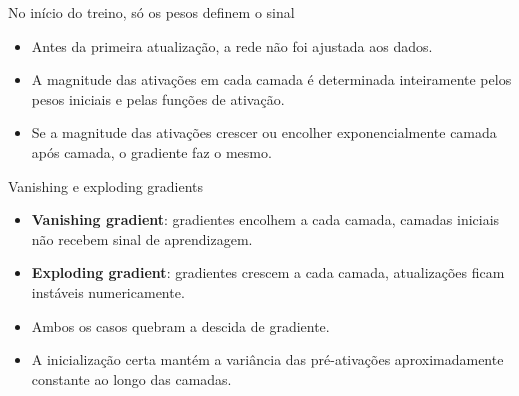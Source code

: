 \documentclass[aspectratio=169,xcolor=dvipsnames]{beamer}
\begin{document}
  \begin{frame}{No início do treino, só os pesos definem o sinal}
    \begin{itemize}
      \item Antes da primeira atualização, a rede não foi ajustada aos dados.
      \item A magnitude das ativações em cada camada é determinada inteiramente pelos
        pesos iniciais e pelas funções de ativação.
      \item Se a magnitude das ativações crescer ou encolher exponencialmente
        camada após camada, o gradiente faz o mesmo.
    \end{itemize}
  \end{frame}

  \begin{frame}{Vanishing e exploding gradients}
    \begin{itemize}
      \item \textbf{Vanishing gradient}: gradientes encolhem a cada camada, camadas
        iniciais não recebem sinal de aprendizagem.
      \item \textbf{Exploding gradient}: gradientes crescem a cada camada, atualizações
        ficam instáveis numericamente.
      \item Ambos os casos quebram a descida de gradiente.
      \item A inicialização \alert{certa} mantém a variância das pré-ativações
        aproximadamente constante ao longo das camadas.
    \end{itemize}
  \end{frame}

\end{document}
